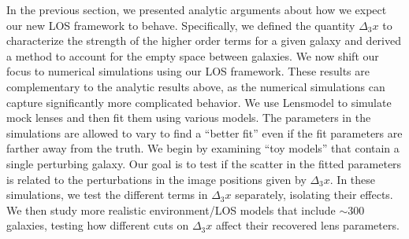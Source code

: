 In the previous section, we presented analytic arguments about how we expect our new LOS framework to behave. Specifically, we defined the quantity $\Delta_3 x$ to characterize the strength of the higher order terms for a given galaxy and derived a method to account for the empty space between galaxies. We now shift our focus to numerical simulations using our LOS framework. These results are complementary to the analytic results above, as the numerical simulations can capture significantly more complicated behavior. We use Lensmodel \citep{Keeton01} to simulate mock lenses and then fit them using various models. The parameters in the simulations are allowed to vary to find a ``better fit'' even if the fit parameters are farther away from the truth. We begin by examining ``toy models'' that contain a single perturbing galaxy. Our goal is to test if the scatter in the fitted parameters is related to the perturbations in the image positions given by $\Delta_3 x$. In these simulations, we test the different terms in $\Delta_3 x$ separately, isolating their effects. We then study more realistic environment/LOS models that include $\sim 300$ galaxies, testing how different cuts on $\Delta_3 x$ affect their recovered lens parameters.
  